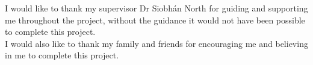 \documentclass[../main.tex]{subfiles}
\begin{document}
\raggedright

I would like to thank my supervisor Dr Siobhán North for guiding and supporting me throughout the project, without the guidance it would not have been possible to complete this project. \\[2mm]
I would also like to thank my family and friends for encouraging me and believing in me to complete this project.
\end{document}
